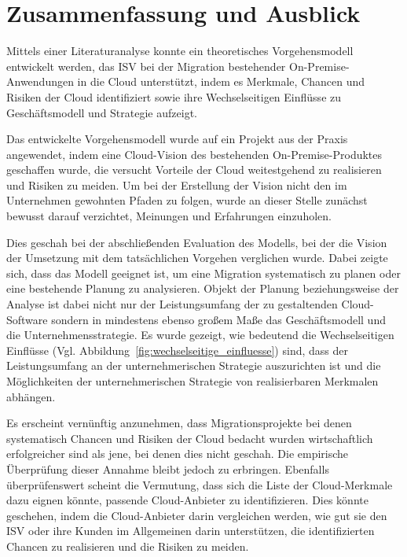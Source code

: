 \section{Zusammenfassung und Ausblick}
\label{cha:fazit}
Mittels einer Literaturanalyse konnte ein theoretisches Vorgehensmodell 
entwickelt werden, das ISV bei der Migration bestehender On-Premise-Anwendungen 
in die Cloud unterstützt, indem es Merkmale, Chancen und Risiken der Cloud 
identifiziert sowie ihre Wechselseitigen Einflüsse zu Geschäftsmodell und 
Strategie aufzeigt. 

Das entwickelte Vorgehensmodell wurde auf ein Projekt aus der Praxis 
angewendet, indem eine Cloud-Vision des bestehenden On-Premise-Produktes 
geschaffen wurde, die versucht Vorteile der Cloud weitestgehend zu realisieren 
und Risiken zu meiden. Um bei der Erstellung der Vision nicht den im 
Unternehmen gewohnten Pfaden zu folgen, wurde an dieser Stelle zunächst 
bewusst darauf verzichtet, Meinungen und Erfahrungen einzuholen.

Dies geschah bei der abschließenden Evaluation des Modells, bei der die Vision 
der Umsetzung mit dem tatsächlichen Vorgehen verglichen wurde. Dabei zeigte 
sich, dass das Modell geeignet ist, um eine Migration systematisch zu planen 
oder eine bestehende Planung zu analysieren. Objekt der Planung beziehungsweise 
der Analyse ist dabei nicht nur der Leistungsumfang der zu gestaltenden 
Cloud-Software sondern in mindestens ebenso großem Maße das Geschäftsmodell und 
die Unternehmensstrategie. Es wurde gezeigt, wie bedeutend die 
Wechselseitigen Einflüsse (Vgl. Abbildung~\ref{fig:wechselseitige_einfluesse}) 
sind, dass der Leistungsumfang an der unternehmerischen Strategie auszurichten 
ist und die Möglichkeiten der unternehmerischen Strategie von realisierbaren 
Merkmalen abhängen.

Es erscheint vernünftig anzunehmen, dass Migrationsprojekte bei denen 
systematisch Chancen und Risiken der Cloud bedacht wurden wirtschaftlich 
erfolgreicher sind als jene, bei denen dies nicht geschah. Die empirische 
Überprüfung dieser Annahme bleibt jedoch zu erbringen. Ebenfalls 
überprüfenswert scheint die Vermutung, dass sich die Liste der Cloud-Merkmale 
dazu eignen könnte, passende Cloud-Anbieter zu identifizieren. Dies könnte 
geschehen, indem die Cloud-Anbieter darin vergleichen werden, wie gut sie den 
ISV oder ihre Kunden im Allgemeinen darin unterstützen, die identifizierten 
Chancen zu realisieren und die Risiken zu meiden.

